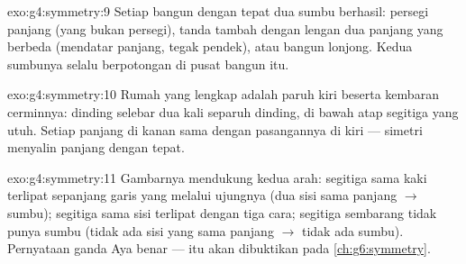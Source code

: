 \begin{solution}{exo:g4:symmetry:9}
Setiap bangun dengan tepat dua sumbu berhasil: persegi panjang (yang
bukan persegi), tanda tambah dengan lengan dua panjang yang berbeda
(mendatar panjang, tegak pendek), atau bangun lonjong. Kedua
sumbunya selalu berpotongan di pusat bangun itu.
\end{solution}

\begin{solution}{exo:g4:symmetry:10}
Rumah yang lengkap adalah paruh kiri beserta kembaran cerminnya:
dinding selebar dua kali separuh dinding, di bawah atap segitiga
yang utuh. Setiap panjang di kanan sama dengan pasangannya di kiri
--- simetri menyalin panjang dengan tepat.
\end{solution}

\begin{solution}{exo:g4:symmetry:11}
Gambarnya mendukung kedua arah: segitiga sama kaki terlipat
sepanjang garis yang melalui ujungnya (dua sisi sama panjang $\to$
sumbu); segitiga sama sisi terlipat dengan tiga cara; segitiga
sembarang tidak punya sumbu (tidak ada sisi yang sama panjang $\to$
tidak ada sumbu). Pernyataan ganda Aya benar --- itu akan dibuktikan
pada \cref{ch:g6:symmetry}.

\end{solution}
